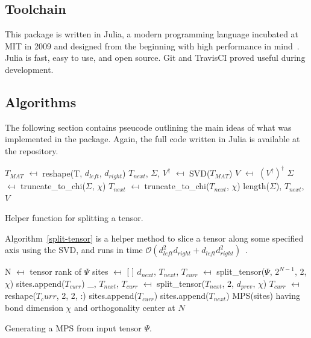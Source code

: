 \documentclass[12pt]{article}
\begin{document}
\begin{multicols}{2}
	\subsection{Toolchain}
	This package is written in Julia, a modern programming language incubated at MIT in 2009 and
	designed from the beginning with high performance in mind~\cite{Julia-lang}.
	Julia is fast, easy to use, and open source.
	Git and TravisCI proved useful during development.
	\subsection{Algorithms}
	The following section contains pseucode outlining the main ideas
	of what was implemented in the package. Again, the full code written
	in Julia is available at the repository.
	\begin{algorithm}[H]
		$T_{MAT}$ $\mapsfrom$ reshape(T, $d_{left}$, $d_{right}$)\;
		$T_{next}$, $\Sigma$, $V^\dagger$ $\mapsfrom$ SVD($T_{MAT}$)\;
		$V$ $\mapsfrom$ $(V^\dagger)^\dagger$\;
		$\Sigma$ $\mapsfrom$ truncate\_to\_chi($\Sigma$, $\chi$)\;
		$T_{next}$ $\mapsfrom$ truncate\_to\_chi($T_{next}$, $\chi$)\;
		\Return length($\Sigma$), $T_{next}$, $V$\;
		\caption{Helper function for splitting a tensor.}
		\label{split-tensor}
	\end{algorithm}
	Algorithm~\ref{split-tensor} is a helper method to slice a tensor along some specified axis using the SVD, and runs in time $\mathcal{O}(d_{left}^2d_{right}+d_{left}d_{right}^2)$~\cite{matrix-stuff}.
	\begin{algorithm}[H]
		N $\mapsfrom$ tensor rank of $\Psi$\;
		sites $\mapsfrom$ [ ]\;
		$d_{next}$, $T_{next}$, $T_{curr}$ $\mapsfrom$ split\_tensor($\Psi$, $2^{N-1}$, 2, $\chi$)\;
		sites.append($T_{curr}$)\;
		\_, $T_{next}$, $T_{curr}$ $\mapsfrom$ split\_tensor($T_{next}$, 2, $d_{prev}$, $\chi$)\;
		$T_{curr}$ $\mapsfrom$ reshape($T_curr$, 2, 2, :)\;
		sites.append($T_{curr}$)\;
		sites.append($T_{next}$)\;
		\Return MPS(sites) having bond dimension $\chi$ and orthogonality center at $N$\;
		\caption{Generating a MPS from input tensor $\Psi$.}
		\label{mps-gen}
	\end{algorithm}


\end{multicols}
\end{document}
